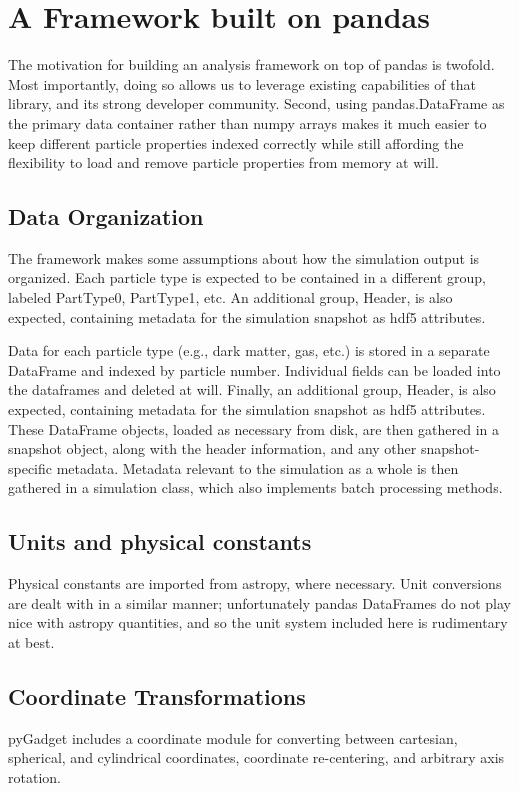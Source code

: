 \section{A Framework built on pandas}
\label{framework}

The motivation for building an analysis framework on top of pandas is twofold.  Most importantly, doing so allows us to leverage existing capabilities of that library, and its strong developer community.  Second, using pandas.DataFrame as the primary data container rather than numpy arrays makes it much easier to keep different particle properties indexed correctly while still affording the flexibility to load and remove particle properties from memory at will.

\subsection{Data Organization}
\label{hierarchy}
The framework makes some assumptions about how the simulation output is organized.  Each particle type is expected to be contained in a different group, labeled PartType0, PartType1, etc. An additional group, Header, is also expected, containing metadata for the simulation snapshot as hdf5 attributes.  

Data for each particle type (e.g., dark matter, gas, etc.) is stored in a separate DataFrame and indexed by particle number.  Individual fields can be loaded into the dataframes and deleted at will.  Finally, an additional group, Header, is also expected, containing metadata for the simulation snapshot as hdf5 attributes.  These DataFrame objects, loaded as necessary from disk, are then gathered in a snapshot object, along with the header information, and any other snapshot-specific metadata.  Metadata relevant to the simulation as a whole is then gathered in a simulation class, which also implements batch processing methods.

\subsection{Units and physical constants}
\label{units}
Physical constants are imported from astropy, where necessary.  Unit conversions are dealt with in a similar manner; unfortunately pandas DataFrames do not play nice with astropy quantities, and so the unit system included here is rudimentary at best.

\subsection{Coordinate Transformations}
\label{coordinates}
pyGadget includes a coordinate module for converting between cartesian, spherical, and cylindrical coordinates, coordinate re-centering, and arbitrary axis rotation.